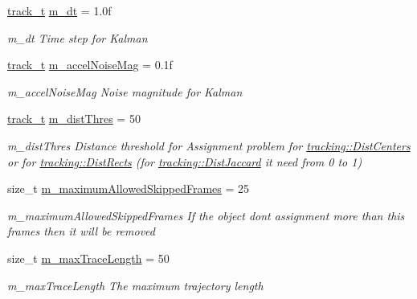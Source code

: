 \begin{DoxyCompactItemize}
\item 
\mbox{\hyperlink{defines_8h_a7ce9c8817b42ab418e61756f579549ab}{track\+\_\+t}} \mbox{\hyperlink{struct_tracker_settings_ae876ad4f3599a782cddb37e318430aaa}{m\+\_\+dt}} = 1.\+0f
\begin{DoxyCompactList}\small\item\em m\+\_\+dt Time step for Kalman \end{DoxyCompactList}\item 
\mbox{\hyperlink{defines_8h_a7ce9c8817b42ab418e61756f579549ab}{track\+\_\+t}} \mbox{\hyperlink{struct_tracker_settings_a9d4bcf1b68d5a13de8f9fea89f3b694f}{m\+\_\+accel\+Noise\+Mag}} = 0.\+1f
\begin{DoxyCompactList}\small\item\em m\+\_\+accel\+Noise\+Mag Noise magnitude for Kalman \end{DoxyCompactList}\item 
\mbox{\hyperlink{defines_8h_a7ce9c8817b42ab418e61756f579549ab}{track\+\_\+t}} \mbox{\hyperlink{struct_tracker_settings_a10e76ae03bd840f6c9180ce67faaa83c}{m\+\_\+dist\+Thres}} = 50
\begin{DoxyCompactList}\small\item\em m\+\_\+dist\+Thres Distance threshold for Assignment problem for \mbox{\hyperlink{namespacetracking_a55743c5e18b9b228c4ba2587260b2502a30176bdc0b4f965c6812767a2fa52e1e}{tracking\+::\+Dist\+Centers}} or for \mbox{\hyperlink{namespacetracking_a55743c5e18b9b228c4ba2587260b2502a43af27628a9ee8e94a23c079eab5d448}{tracking\+::\+Dist\+Rects}} (for \mbox{\hyperlink{namespacetracking_a55743c5e18b9b228c4ba2587260b2502a731b827afcbde6eb19624ad6130b1798}{tracking\+::\+Dist\+Jaccard}} it need from 0 to 1) \end{DoxyCompactList}\item 
size\+\_\+t \mbox{\hyperlink{struct_tracker_settings_a7825c3e88ee979fba2844c238fc51139}{m\+\_\+maximum\+Allowed\+Skipped\+Frames}} = 25
\begin{DoxyCompactList}\small\item\em m\+\_\+maximum\+Allowed\+Skipped\+Frames If the object don\textquotesingle{}t assignment more than this frames then it will be removed \end{DoxyCompactList}\item 
size\+\_\+t \mbox{\hyperlink{struct_tracker_settings_abc7ce62dfe8de5ae33506aac41fddcac}{m\+\_\+max\+Trace\+Length}} = 50
\begin{DoxyCompactList}\small\item\em m\+\_\+max\+Trace\+Length The maximum trajectory length \end{DoxyCompactList}\item 

\end{DoxyCompactItemize}
